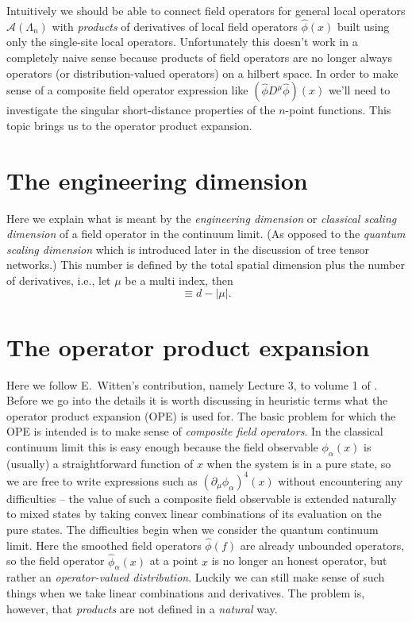 \documentclass[prl,twocolumn,lengthcheck,superscriptaddress]{revtex4-1}
\theoremstyle{definition}
\theoremstyle{remark}
\begin{document}
Intuitively we should be able to connect field operators for general local operators $\mathcal{A}(\Lambda_n)$ with \emph{products} of derivatives of local field operators $\widehat{\phi}(x)$ built using only the single-site local operators. Unfortunately this doesn't work in a completely naive sense because products of field operators are no longer always operators (or distribution-valued operators) on a hilbert space. In order to make sense of a composite field operator expression like $(\widehat{\phi} D^\mu\widehat{\phi})(x)$ we'll need to investigate the singular short-distance properties of the $n$-point functions. This topic brings us to the operator product expansion.

\section{The engineering dimension}
Here we explain what is meant by the \emph{engineering dimension} or \emph{classical scaling dimension} of a field operator in the continuum limit. (As opposed to the \emph{quantum scaling dimension} which is introduced later in the discussion of tree tensor networks.) This number is defined by the total spatial dimension plus the number of derivatives, i.e., let $\mu$ be a multi index, then 
\begin{equation}
	[D^\mu \widehat{\phi}(f)] \equiv {d} - |\mu|. 
\end{equation}

\section{The operator product expansion}
Here we follow E.\ Witten's contribution, namely Lecture 3, to volume 1 of \cite{deligne:1999a}. Before we go into the details it is worth discussing in heuristic terms what the operator product expansion (OPE) is used for. The basic problem for which the OPE is intended is to make sense of \emph{composite field operators}. In the classical continuum limit this is easy enough because the field observable $\phi_\alpha(x)$ is (usually) a straightforward function of $x$ when the system is in a pure state, so we are free to write expressions such as $(\partial_\mu \phi_\alpha)^4(x)$ without encountering any difficulties -- the value of such a composite field observable is extended naturally to mixed states by taking convex linear combinations of its evaluation on the pure states. The difficulties begin when we consider the quantum continuum limit. Here the smoothed field operators $\widehat{\phi}(f)$ are already unbounded operators, so the field operator $\widehat{\phi}_\alpha(x)$ at a point $x$ is no longer an honest operator, but rather an \emph{operator-valued distribution}. Luckily we can still make sense of such things when we take linear combinations and derivatives. The problem is, however, that \emph{products} are not defined in a \emph{natural} way. 
\end{document}
